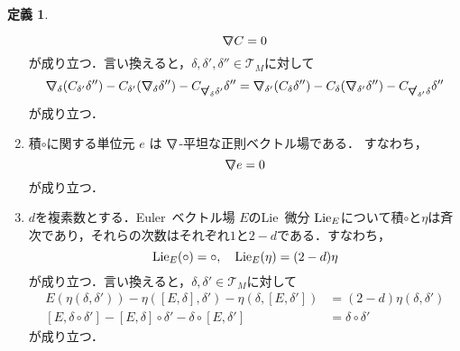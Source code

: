 \documentclass[a4paper,11pt]{jbook}
\theoremstyle{plain}
\theoremstyle{definition}
\newtheorem{defn}[thm]{定義}
\theoremstyle{remark}
\theoremstyle{proof}
\numberwithin{equation}{section}
\def\T{{\mathcal T}}
\def\ns{{\nabla}\hspace{-1.4mm}\raisebox{0.3mm}{\text{\footnotesize{\bf /}}}}
\begin{document}
\begin{defn}
\begin{enumerate}
\begin{equation}
\ns C=0
\end{equation}
が成り立つ．言い換えると，$\delta,\delta',\delta''\in\T_{M}$に対して
\begin{equation}
\ns_{\delta}(C_{\delta'}\delta'')-C_{\delta'}(\ns_{\delta}\delta'')-C_{\ns_{\delta}\delta'}\delta''=\ns_{\delta'}(C_{\delta}\delta'')-C_{\delta}(\ns_{\delta'}\delta'')-C_{\ns_{\delta'}\delta}\delta''
\end{equation}
が成り立つ．
\item  積$\circ $に関する単位元 $e$ は $\ns$-平坦な正則ベクトル場である． すなわち，
\begin{equation}
\ns e=0
\end{equation}
が成り立つ．
\item $d$を複素数とする．Euler\ ベクトル場 $E$のLie\ 微分 ${\rm Lie}_{E}$について積$\circ$と$\eta$は斉次であり，それらの次数はそれぞれ$1$と$2-d$である．すなわち，
\begin{equation}
{\rm Lie}_E(\circ)=\circ,\quad {\rm Lie}_E(\eta)=(2-d)\eta
\end{equation}
が成り立つ．言い換えると，$\delta,\delta'\in\T_{M}$に対して
\begin{align}
E(\eta(\delta,\delta'))-\eta([E,\delta],\delta')-\eta(\delta,[E,\delta'])&=(2-d)\eta(\delta,\delta') \\
\left[E,\delta\circ\delta'\right]-\left[E,\delta\right]\circ\delta'-\delta\circ\left[E,\delta'\right]&=\delta\circ\delta'
\end{align}
が成り立つ．
\end{enumerate}
\end{defn}
\end{document}
